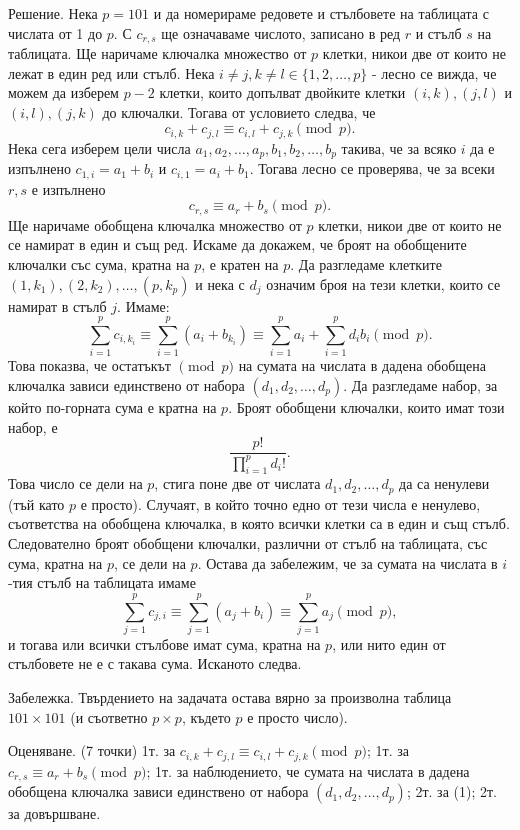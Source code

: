 Решение. Нека $p=101$ и да номерираме редовете и стълбовете на таблицата с числата от 1 до $p$. С $c_{r,s}$ ще означаваме числото, записано в ред $r$ и стълб $s$ на таблицата. Ще наричаме ключалка множество от $p$ клетки, никои две от които не лежат в един ред или стълб. Нека $i\ne j,k\ne l\in\{1,2,\ldots,p\}$ - лесно се вижда, че можем да изберем $p-2$ клетки, които допълват двойките клетки $(i,k),(j,l)$ и $(i,l),(j,k)$ до ключалки. Тогава от условието следва, че
$$
c_{i,k}+c_{j,l}\equiv c_{i,l}+c_{j,k}\pmod p.
$$
Нека сега изберем цели числа $a_1,a_2,\ldots,a_p,b_1,b_2,\ldots,b_p$ такива, че за всяко $i$ да е изпълнено $c_{1,i}=a_1+b_i$ и $c_{i,1}=a_i+b_1$. Тогава лесно се проверява, че за всеки $r,s$ е изпълнено
$$
c_{r,s}\equiv a_r+b_s\pmod p.
$$
Ще наричаме обобщена ключалка множество от $p$ клетки, никои две от които не се намират в един и същ ред. Искаме да докажем, че броят на обобщените ключалки със сума, кратна на $p$, е кратен на $p$. Да разгледаме клетките $(1,k_1),(2,k_2),\ldots,(p,k_p)$ и нека с $d_j$ означим броя на тези клетки, които се намират в стълб $j$. Имаме:
$$
\sum_{i=1}^p c_{i,k_i}\equiv\sum_{i=1}^p(a_i+b_{k_i})\equiv\sum_{i=1}^p a_i+\sum_{i=1}^p d_i b_i\pmod p.
$$
Това показва, че остатъкът $\pmod p$ на сумата на числата в дадена обобщена ключалка зависи единствено от набора $(d_1,d_2,\ldots,d_p)$. Да разгледаме набор, за който по-горната сума е кратна на $p$. Броят обобщени ключалки, които имат този набор, е
$$
\frac{p!}{\prod_{i=1}^p d_i!}. \tag{1}
$$
Това число се дели на $p$, стига поне две от числата $d_1,d_2,\ldots,d_p$ да са ненулеви (тъй като $p$ е просто). Случаят, в който точно едно от тези числа е ненулево, съответства на обобщена ключалка, в която всички клетки са в един и същ стълб. Следователно броят обобщени ключалки, различни от стълб на таблицата, със сума, кратна на $p$, се дели на $p$. Остава да забележим, че за сумата на числата в $i$-тия стълб на таблицата имаме
$$
\sum_{j=1}^p c_{j,i}\equiv\sum_{j=1}^p(a_j+b_i)\equiv\sum_{j=1}^p a_j\pmod p,
$$
и тогава или всички стълбове имат сума, кратна на $p$, или нито един от стълбовете не е с такава сума. Исканото следва.

Забележка. Твърдението на задачата остава вярно за произволна таблица $101\times101$ (и съответно $p\times p$, където $p$ е просто число).

Оценяване. (7 точки) 1т. за $c_{i,k}+c_{j,l}\equiv c_{i,l}+c_{j,k}\pmod p$; 1т. за $c_{r,s}\equiv a_r+b_s\pmod p$; 1т. за наблюдението, че сумата на числата в дадена обобщена ключалка зависи единствено от набора $(d_1,d_2,\ldots,d_p)$; 2т. за (1); 2т. за довършване.
